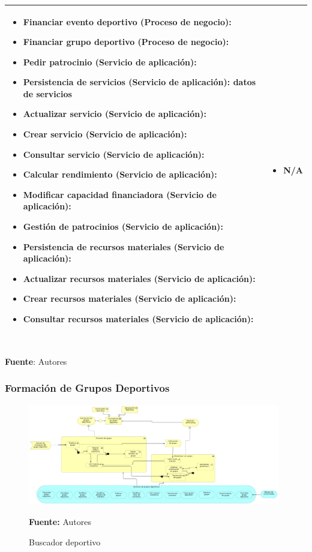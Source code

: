 \begin{table}[!htb]
\begin{center}
{\begin{tabular}{|p{7cm}|p{4cm}|}
\begin{itemize}
				\item \textbf{Financiar evento deportivo (Proceso de negocio):} 
				\item \textbf{Financiar grupo deportivo (Proceso de negocio):} 
				\item \textbf{Pedir patrocinio (Servicio de aplicación):} 
				\item \textbf{Persistencia de servicios (Servicio de aplicación):}  datos de servicios
				\item \textbf{Actualizar servicio (Servicio de aplicación):} 
				\item \textbf{Crear servicio (Servicio de aplicación):} 
				\item \textbf{Consultar servicio (Servicio de aplicación):} 
				\item \textbf{Calcular rendimiento (Servicio de aplicación):} 
				\item \textbf{Modificar capacidad financiadora (Servicio de aplicación):} 
				\item \textbf{Gestión de patrocinios (Servicio de aplicación):} 
				\item \textbf{Persistencia de recursos materiales (Servicio de aplicación):} 
				\item \textbf{Actualizar recursos materiales (Servicio de aplicación):} 
				\item \textbf{Crear recursos materiales (Servicio de aplicación):} 
				\item \textbf{Consultar recursos materiales (Servicio de aplicación):} 
			\end{itemize} 
			&
			\begin{itemize}
				\item N/A
			\end{itemize} 
			\\
			\hline
		\end{tabular}
		} \\
		\textbf{Fuente}: Autores
	\end{center}
\end{table}

\subsubsection{Formación de Grupos Deportivos}

\begin{figure}[!htb]
  \begin{center}
    \includegraphics[width=11cm]{./imagenes/business_process/formaciongruposdeportivos.png}
    \caption{Buscador deportivo}
    \label{fig:BF_BuscadorDeportivo}
    \textbf{Fuente:}  Autores
  \end{center}
\end{figure}

